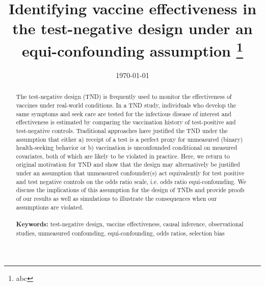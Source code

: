 \documentclass[11pt]{article}
\begin{document}
\begin{titlepage}
\title{Identifying vaccine effectiveness in the test-negative design under an equi-confounding assumption \thanks{abc}}
\author[1]{ }
\date{\today}
\maketitle

\begin{abstract}
    The test-negative design (TND) is frequently used to monitor the effectiveness of vaccines under real-world conditions. In a TND study, individuals who develop the same symptoms and seek care are tested for the infectious disease of interest and effectiveness is estimated by comparing the vaccination history of test-positive and test-negative controls. Traditional approaches have justified the TND under the assumption that either a) receipt of a test is a perfect proxy for unmeasured (binary) health-seeking behavior or b) vaccination is unconfounded conditional on measured covariates, both of which are likely to be violated in practice. Here, we return to original motivation for TND and show that the design may alternatively be justified under an assumption that unmeasured confounder(s) act equivalently for test positive and test negative controls on the odds ratio scale, i.e. odds ratio equi-confounding. We discuss the implications of this assumption for the design of TNDs and provide proofs of our results as well as simulations to illustrate the consequences when our assumptions are violated.
\noindent \\
\vspace{0in} \\
\noindent\textbf{Keywords:} test-negative design, vaccine effectiveness, causal inference, observational studies, unmeasured confounding, equi-confounding, odds ratios, selection bias
\bigskip
\end{abstract}
\setcounter{page}{0}
\thispagestyle{empty}
\end{titlepage}
\pagebreak \newpage

\doublespacing
\end{document}
